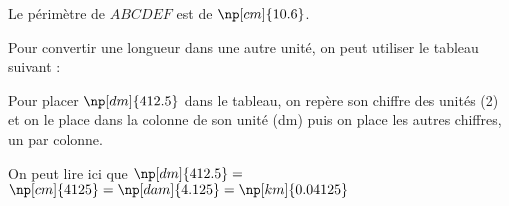 \documentclass{classe-tex3R}
\begin{document}
\begin{exemple}
{\begin{minipage}{0.56\linewidth}
  Le périmètre de $ABCDEF$ est de $\np[cm]{10.6}$.
  \end{minipage}}\hfill%
\end{exemple}




\begin{methode}
  Pour convertir une longueur dans une autre unité, on peut utiliser le tableau suivant :


  \Tableau[Metre,NbLignes=1,Fleches]{}


\end{methode}



\begin{exemple}
Pour placer $\np[dm]{412.5}$ dans le tableau, on repère son chiffre des unités (2) et on le place dans la colonne de son unité (dm) puis on place les autres chiffres, un par colonne.


  On peut lire ici que $\np[dm]{412.5} =$ $ \np[cm]{4125} = \np[dam]{4.125} = \np[km]{0.04125}$

\end{exemple}




\end{document}
